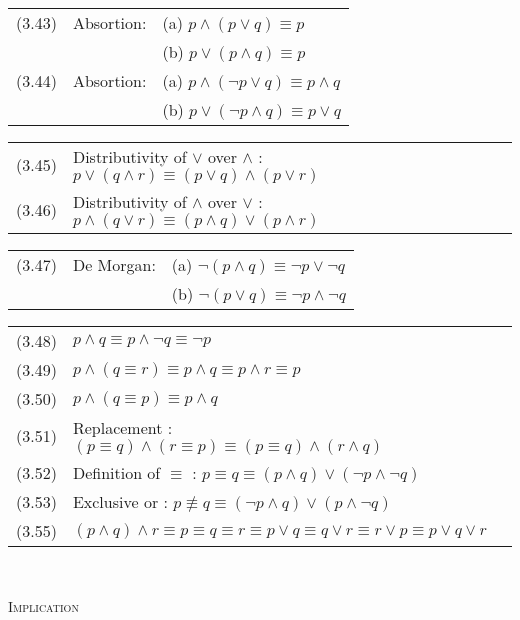 \begin{tabular}{lll}
(3.43) & Absortion: & (a) $p\wedge (p\vee q) \equiv p$\\
	& 	    & (b) $p \vee (p \wedge q) \equiv p$\\
(3.44) & Absortion: & (a) $p \wedge (\neg p\vee q) \equiv p \wedge  q$\\
	&	    & (b) $p \vee (\neg p \wedge q) \equiv p \vee q$\\
\end{tabular}

\begin{tabular}{lll}
(3.45) &  Distributivity of $\vee$ over $\wedge$ : $p \vee (q\wedge r) \equiv (p\vee q) \wedge (p \vee r)$\\
(3.46) & Distributivity of $\wedge$ over $\vee$ : $p \wedge (q\vee r) \equiv (p\wedge q) \vee (p \wedge r)$\\
\end{tabular}

\begin{tabular}{lll}
(3.47) &  De Morgan: & (a) $\neg (p\wedge q) \equiv \neg p \vee \neg q  $\\
       &  	     & (b) $\neg (p\vee q) \equiv \neg p \wedge \neg q $\\
\end{tabular}

\begin{tabular}{lll}
(3.48) &  $p\wedge q \equiv p \wedge \neg q \equiv \neg p $\\
(3.49) &  $p\wedge (q \equiv r) \equiv p\wedge q \equiv p\wedge r \equiv p $\\
(3.50) &  $p\wedge (q \equiv p) \equiv p \wedge q  $\\
(3.51) &  Replacement : $ (p\equiv q) \wedge (r \equiv p) \equiv (p\equiv q) \wedge (r\wedge q) $\\
(3.52) &  Definition of $\equiv$ : $ p \equiv q \equiv (p\wedge q) \vee (\neg p \wedge \neg q) $\\
(3.53) &  Exclusive or : $p\not \equiv q \equiv (\neg p \wedge q) \vee (p\wedge \neg q) $\\
(3.55) &  $(p\wedge q) \wedge r \equiv p \equiv q \equiv r \equiv p\vee q \equiv q\vee r \equiv r \vee p \equiv p \vee q \vee r $\\
\end{tabular}

\ \par

\textsc{Implication\\}

